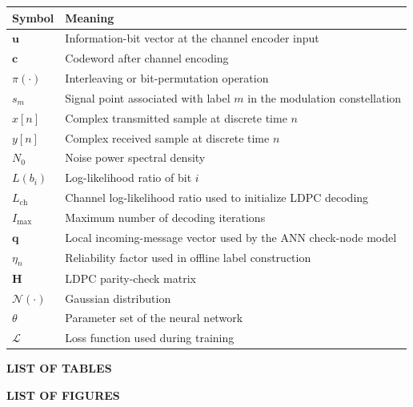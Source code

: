\documentclass[a4paper,14pt]{extreport}
\makeatletter
\newcommand{\customlistoftables}{%
  \begin{center}
    {\bfseries LIST OF TABLES}
  \end{center}
  \vspace{0.25cm}
  \@starttoc{lot}%
}
\newcommand{\customlistoffigures}{%
  \begin{center}
    {\bfseries LIST OF FIGURES}
  \end{center}
  \vspace{0.25cm}
  \@starttoc{lof}%
}
\makeatother
\begin{document}
\begin{longtable}{p{3cm}p{11cm}}
\toprule
\textbf{Symbol} & \textbf{Meaning}\\
\midrule
$\mathbf{u}$ & Information-bit vector at the channel encoder input\\
$\mathbf{c}$ & Codeword after channel encoding\\
$\pi(\cdot)$ & Interleaving or bit-permutation operation\\
$s_m$ & Signal point associated with label $m$ in the modulation constellation\\
$x[n]$ & Complex transmitted sample at discrete time $n$\\
$y[n]$ & Complex received sample at discrete time $n$\\
$N_0$ & Noise power spectral density\\
$L(b_i)$ & Log-likelihood ratio of bit $i$\\
$L_{\mathrm{ch}}$ & Channel log-likelihood ratio used to initialize LDPC decoding\\
$I_{\max}$ & Maximum number of decoding iterations\\
$\mathbf{q}$ & Local incoming-message vector used by the ANN check-node model\\
$\eta_n$ & Reliability factor used in offline label construction\\
$\mathbf{H}$ & LDPC parity-check matrix\\
$\mathcal{N}(\cdot)$ & Gaussian distribution\\
$\theta$ & Parameter set of the neural network\\
$\mathcal{L}$ & Loss function used during training\\
\bottomrule
\end{longtable}

\newpage
{}
\customlistoftables

\newpage
{}
\customlistoffigures

\clearpage
{}
\setcounter{page}{1}


\end{document}
